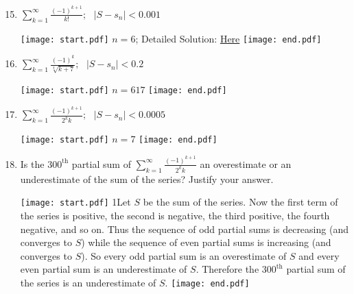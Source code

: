\documentclass[12pt]{article}
\begin{document}
\begin{enumerate}
\setcounter{enumi}{14}

\item $\sum_{k=1}^{\infty}{\frac{(-1)^{k+1}}{k!}}; \text{         }|S-s_n|<0.001$

\texttt{[image: start.pdf]}
{{$n = 6$; Detailed Solution: \textcolor{blue}{\href{http://www.math.drexel.edu/classes/Calculus/resources/Math123HW/Solutions/123_10_Alternating_Series_15.pdf}{Here}}}}
\texttt{[image: end.pdf]}


\item $\sum_{k=1}^{\infty}{\frac{(-1)^k}{\sqrt[4]{k+7}}}; \text{         }|S-s_n|<0.2$

\texttt{[image: start.pdf]}
{{$n = 617$}}
\texttt{[image: end.pdf]}


\item $\sum_{k=1}^{\infty}{\frac{(-1)^{k+1}}{2^k k}}; \text{         }|S-s_n|<0.0005$

\texttt{[image: start.pdf]}
{{$n = 7$}}
\texttt{[image: end.pdf]}


\item Is the $300^{\text {th}}$ partial sum of $\textstyle \sum_{k=1}^{\infty}{\frac{(-1)^{k+1}}{2^k k}}$ an overestimate or an underestimate of the sum of the series?  Justify your answer.

\texttt{[image: start.pdf]}
{{{1\linewidth}{Let $S$ be the sum of the series.  Now the first term of the series is positive, the second is negative, the third positive, the fourth negative, and so on.  
Thus the sequence of odd partial sums is decreasing (and converges to $S$) while the sequence of even partial sums is increasing (and converges to $S$).  So every odd partial sum is an
overestimate of $S$ and every even partial sum is an underestimate of $S$.  Therefore the $300^{\text {th}}$ partial sum of the series is an underestimate of $S$.       }}}
\texttt{[image: end.pdf]}





\end{enumerate}
\end{document}
